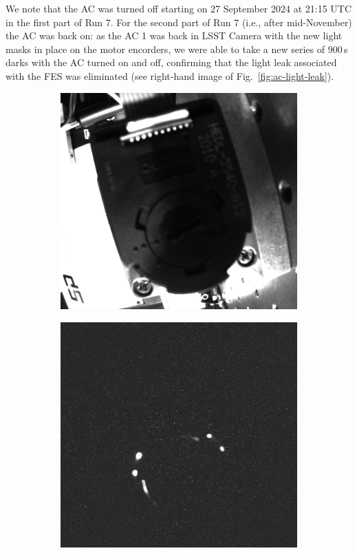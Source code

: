 We note that the AC was turned off starting on 27 September 2024 at 21:15 UTC in the
first part of Run 7. For the second part of Run 7 (i.e., after
mid-November) the AC was back on: as the AC 1 was back in LSST Camera with
the new light masks in place on the motor encorders, we were able to take a new series of
900\,s darks with the AC turned on and off, confirming that the light leak
associated with the FES was eliminated (see right-hand image of Fig.~\ref{fig:ac-light-leak}).
\begin{figure}[ht]
\centering
\begin{subfigure}{0.32\textwidth}
  \centering
  \includegraphics[width=1.0\textwidth]{figures/Codershape.png}
\end{subfigure}%
\begin{subfigure}{0.32\textwidth}
  \centering
  \includegraphics[width=1\textwidth]{figures/Coderligth.png}

\end{subfigure}
\end{figure}
